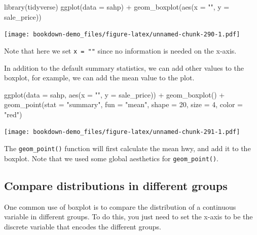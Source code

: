 \documentclass[
]{book}
\newenvironment{Shaded}{\begin{snugshade}}{\end{snugshade}}
\newcommand{\AttributeTok}[1]{\textcolor[rgb]{0.77,0.63,0.00}{#1}}
\newcommand{\DecValTok}[1]{\textcolor[rgb]{0.00,0.00,0.81}{#1}}
\newcommand{\FunctionTok}[1]{\textcolor[rgb]{0.00,0.00,0.00}{#1}}
\newcommand{\NormalTok}[1]{#1}
\newcommand{\SpecialCharTok}[1]{\textcolor[rgb]{0.00,0.00,0.00}{#1}}
\newcommand{\StringTok}[1]{\textcolor[rgb]{0.31,0.60,0.02}{#1}}
\begin{document}
\begin{Shaded}
\begin{Highlighting}[]
\FunctionTok{library}\NormalTok{(tidyverse)}
\FunctionTok{ggplot}\NormalTok{(}\AttributeTok{data =}\NormalTok{ sahp) }\SpecialCharTok{+} \FunctionTok{geom\_boxplot}\NormalTok{(}\FunctionTok{aes}\NormalTok{(}\AttributeTok{x =} \StringTok{""}\NormalTok{, }\AttributeTok{y =}\NormalTok{ sale\_price))}
\end{Highlighting}
\end{Shaded}

\texttt{[image: bookdown-demo\_files/figure-latex/unnamed-chunk-290-1.pdf]}

Note that here we set \texttt{x\ =\ ""} since no information is needed on the x-axis.

In addition to the default summary statistics, we can add other values to the boxplot, for example, we can add the mean value to the plot.

\begin{Shaded}
\begin{Highlighting}[]
\FunctionTok{ggplot}\NormalTok{(}\AttributeTok{data =}\NormalTok{ sahp, }\FunctionTok{aes}\NormalTok{(}\AttributeTok{x =} \StringTok{""}\NormalTok{, }\AttributeTok{y =}\NormalTok{ sale\_price)) }\SpecialCharTok{+} \FunctionTok{geom\_boxplot}\NormalTok{() }\SpecialCharTok{+}
  \FunctionTok{geom\_point}\NormalTok{(}\AttributeTok{stat =} \StringTok{"summary"}\NormalTok{, }\AttributeTok{fun =} \StringTok{"mean"}\NormalTok{, }\AttributeTok{shape =} \DecValTok{20}\NormalTok{, }\AttributeTok{size =} \DecValTok{4}\NormalTok{, }\AttributeTok{color =} \StringTok{"red"}\NormalTok{)}
\end{Highlighting}
\end{Shaded}

\texttt{[image: bookdown-demo\_files/figure-latex/unnamed-chunk-291-1.pdf]}

The \texttt{geom\_point()} function will first calculate the mean hwy, and add it to the boxplot. Note that we used some global aesthetics for \texttt{geom\_point()}.

\hypertarget{compare-distributions-in-different-groups}{%
\subsection{Compare distributions in different groups}\label{compare-distributions-in-different-groups}}

One common use of boxplot is to compare the distribution of a continuous variable in different groups. To do this, you just need to set the x-axis to be the discrete variable that encodes the different groups.
\end{document}
